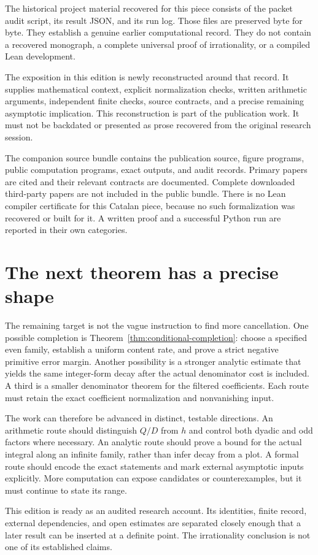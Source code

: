 The historical project material recovered for this piece consists of the packet audit script, its result JSON, and its run log. Those files are preserved byte for byte. They establish a genuine earlier computational record. They do not contain a recovered monograph, a complete universal proof of irrationality, or a compiled Lean development.

The exposition in this edition is newly reconstructed around that record. It supplies mathematical context, explicit normalization checks, written arithmetic arguments, independent finite checks, source contracts, and a precise remaining asymptotic implication. This reconstruction is part of the publication work. It must not be backdated or presented as prose recovered from the original research session.

The companion source bundle contains the publication source, figure programs, public computation programs, exact outputs, and audit records. Primary papers are cited and their relevant contracts are documented. Complete downloaded third-party papers are not included in the public bundle. There is no Lean compiler certificate for this Catalan piece, because no such formalization was recovered or built for it. A written proof and a successful Python run are reported in their own categories.

\section{The next theorem has a precise shape}

The remaining target is not the vague instruction to find more cancellation. One possible completion is Theorem~\ref{thm:conditional-completion}: choose a specified even family, establish a uniform content rate, and prove a strict negative primitive error margin. Another possibility is a stronger analytic estimate that yields the same integer-form decay after the actual denominator cost is included. A third is a smaller denominator theorem for the filtered coefficients. Each route must retain the exact coefficient normalization and nonvanishing input.

The work can therefore be advanced in distinct, testable directions. An arithmetic route should distinguish $Q/D$ from $h$ and control both dyadic and odd factors where necessary. An analytic route should prove a bound for the actual integral along an infinite family, rather than infer decay from a plot. A formal route should encode the exact statements and mark external asymptotic inputs explicitly. More computation can expose candidates or counterexamples, but it must continue to state its range.

This edition is ready as an audited research account. Its identities, finite record, external dependencies, and open estimates are separated closely enough that a later result can be inserted at a definite point. The irrationality conclusion is not one of its established claims.


